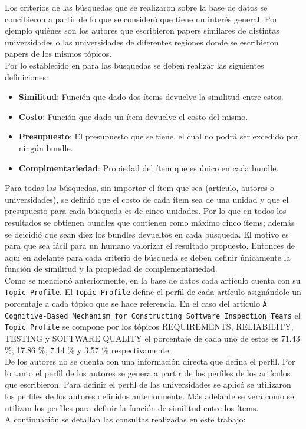 Los criterios de las búsquedas que se realizaron sobre la base de datos se concibieron a partir de lo que se consideró que tiene un interés general. Por ejemplo quiénes son los autores que escribieron papers similares de distintas universidades o las universidades de diferentes regiones donde se escribieron papers de los mismos tópicos.\\
Por lo establecido en \cite{compositeRetrival} para las búsquedas se deben realizar las siguientes definiciones:
\begin{itemize}
  \item \textbf{Similitud}: Función que dado dos ítems devuelve la similitud entre estos.
  \item \textbf{Costo}: Función que dado un ítem devuelve el costo del mismo.
  \item \textbf{Presupuesto}: El presupuesto que se tiene, el cual no podrá ser excedido por ningún bundle.
  \item \textbf{Complmentariedad}: Propiedad del ítem que es único en cada bundle.
\end{itemize}
Para todas las búsquedas, sin importar el ítem que sea (artículo, autores o universidades),  se definió que el costo de cada ítem sea de una unidad y que el presupuesto para cada búsqueda es de cinco unidades. Por lo que en todos los resultados se obtienen bundles que contienen como máximo cinco ítems; además se deicidió que sean diez los bundles devueltos en cada búsqueda. El motivo es para que sea fácil para un humano valorizar el resultado propuesto. Entonces de aquí en adelante para cada criterio de búsqueda se deben definir únicamente la función de similitud y la propiedad de complementariedad.\\
Como se mencionó anteriormente, en la base de datos cada artículo cuenta con su \texttt{Topic Profile}. El \texttt{Topic Profile} define el perfil de cada artículo asignándole un porcentaje a cada tópico que se hace referencia. En el caso del artículo \texttt{A Cognitive-Based Mechanism for Constructing Software Inspection Teams} el \texttt{Topic Profile} se compone por los tópicos  REQUIREMENTS, RELIABILITY, TESTING y SOFTWARE QUALITY el porcentaje de cada uno de estos es 71.43 \%, 17.86 \%, 7.14 \% y 3.57 \% respectivamente. \\
De los autores no se cuenta con una información directa que defina el perfil. Por lo tanto el perfil de los autores se genera a partir de los perfiles de los artículos que escribieron. Para definir el perfil de las universidades se aplicó se utilizaron los perfiles de los autores definidos anteriormente. Más adelante se verá como se utilizan los perfiles para definir la función de similitud entre los ítems.\\
A continuación se detallan las consultas realizadas en este trabajo:
